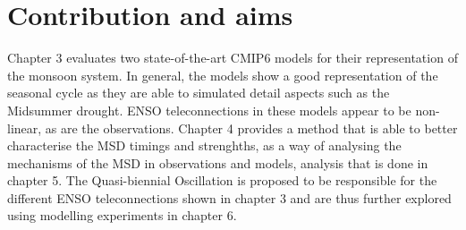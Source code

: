 \section{Contribution and aims}

 Chapter 3 evaluates two state-of-the-art CMIP6 models for their representation of the monsoon system. In general, the models show a good representation of the seasonal cycle as they are able to simulated detail aspects such as the Midsummer drought. ENSO teleconnections in these models appear to be non-linear, as are the observations. Chapter 4 provides a method that is able to better characterise the MSD timings and strenghths, as a way of analysing the mechanisms of the MSD in observations and models, analysis that is done in chapter 5. The Quasi-biennial Oscillation is proposed to be responsible for the different ENSO teleconnections shown in chapter 3 and are thus further explored using modelling experiments in chapter 6. 